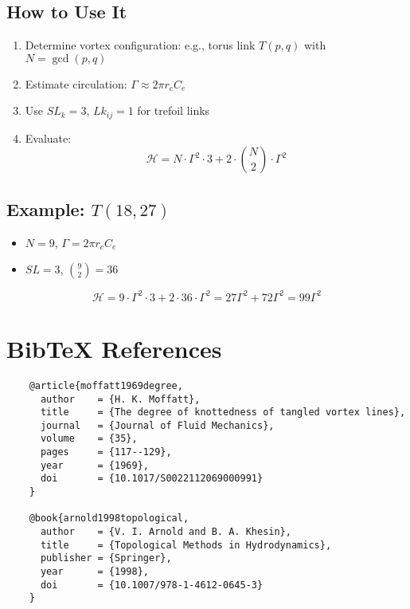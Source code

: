     \subsection{ How to Use It}
    \begin{enumerate}
        \item Determine vortex configuration: e.g., torus link $T(p,q)$ with $N = \gcd(p,q)$
        \item Estimate circulation: $\Gamma \approx 2\pi r_c C_e$
        \item Use $SL_k = 3$, $Lk_{ij} = 1$ for trefoil links
        \item Evaluate:
        \[ \mathcal{H} = N \cdot \Gamma^2 \cdot 3 + 2 \cdot \binom{N}{2} \cdot \Gamma^2 \]
    \end{enumerate}

    \subsection*{ Example: $T(18,27)$}
    \begin{itemize}
        \item $N = 9$, $\Gamma = 2\pi r_c C_e$
        \item $SL = 3$, $\binom{9}{2} = 36$
    \end{itemize}
    \begin{equation}
        \mathcal{H} = 9 \cdot \Gamma^2 \cdot 3 + 2 \cdot 36 \cdot \Gamma^2 = 27\Gamma^2 + 72\Gamma^2 = 99\Gamma^2
    \end{equation}

    \section*{BibTeX References}
    \begin{verbatim}
    @article{moffatt1969degree,
      author    = {H. K. Moffatt},
      title     = {The degree of knottedness of tangled vortex lines},
      journal   = {Journal of Fluid Mechanics},
      volume    = {35},
      pages     = {117--129},
      year      = {1969},
      doi       = {10.1017/S0022112069000991}
    }

    @book{arnold1998topological,
      author    = {V. I. Arnold and B. A. Khesin},
      title     = {Topological Methods in Hydrodynamics},
      publisher = {Springer},
      year      = {1998},
      doi       = {10.1007/978-1-4612-0645-3}
    }
    \end{verbatim}

